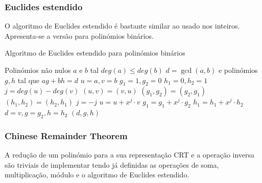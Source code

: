 \subsubsection{Euclides estendido}
O algoritmo de Euclides estendido é bastante similar ao usado nos inteiros. Apresenta-se a versão para polinómios binários.
\begin{algorithm}[htb!]
  \caption{Algoritmo de Euclides estendido para polinómios binários}\label{alg:xgcd}
  \begin{algorithmic}
    \Require Polinómios não nulos $a$ e $b$ tal $deg(a) \leq deg(b)$
    \Ensure $d = \gcd(a,b)$ e polinómios $g,h$ tal que $ag + bh = d$
    \State $u = a, v = b$
    \State $g_1 = 1, g_2 = 0$
    \State $h_1 = 0, h_2 = 1$
      \State $j = deg(u) - deg(v)$
        \State $(u,v) = (v,u)$
        \State $(g_1, g_2) = (g_2, g_1)$
        \State $(h_1, h_2) = (h_2, h_1)$
        \State $j = -j$
      \EndIf
      \State $u = u + x^j \cdot v$
      \State $g_1 = g_1 + x^j \cdot g_2$
      \State $h_1 = h_1 + x^j \cdot h_2$
    \EndWhile
    \State $d = v, g = g_2, h = h_2$
    \State \Return $(d, g, h)$
  \end{algorithmic}
\end{algorithm}
\subsubsection{Chinese Remainder Theorem}
A redução de um polinómio para a sua representação CRT e a operação inversa são triviais de implementar tendo já definidas as operações de soma, multiplicação, módulo e o algoritmo de Euclides estendido.